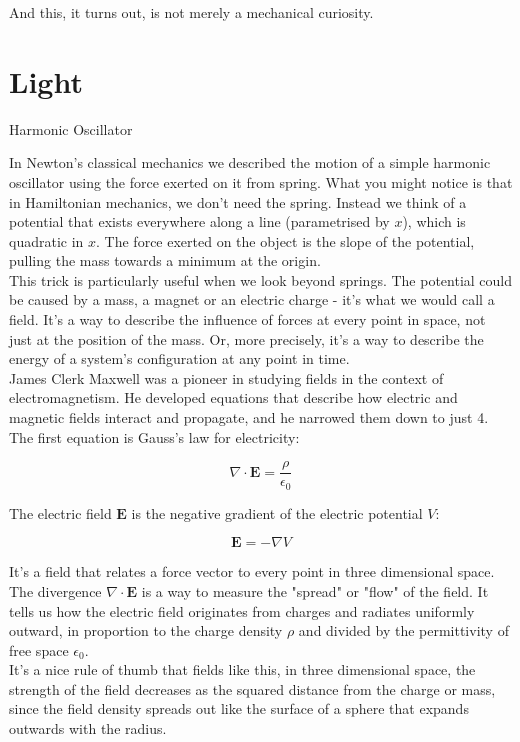 \documentclass[krantz1,ChapterTOCs]{krantz}
\begin{document}
And this, it turns out, is not merely a mechanical curiosity.\\

\part{Light}

Harmonic Oscillator

In Newton's classical mechanics we described the motion of a simple harmonic oscillator using the force exerted on it from spring. What you might notice is that in Hamiltonian mechanics, we don't need the spring. Instead we think of a potential that exists everywhere along a line (parametrised by $x$), which is quadratic in $x$. The force exerted on the object is the slope of the potential, pulling the mass towards a minimum at the origin.\\

This trick is particularly useful when we look beyond springs. The potential could be caused by a mass, a magnet or an electric charge - it's what we would call a field. It's a way to describe the influence of forces at every point in space, not just at the position of the mass. Or, more precisely, it's a way to describe the energy of a system's configuration at any point in time.\\

James Clerk Maxwell was a pioneer in studying fields in the context of electromagnetism. He developed equations that describe how electric and magnetic fields interact and propagate, and he narrowed them down to just 4.\\

The first equation is Gauss's law for electricity:

\[
\nabla \cdot \mathbf{E} = \frac{\rho}{\epsilon_0}
\]

The electric field \(\mathbf{E}\) is the negative gradient of the electric potential \(V\):

\[
\mathbf{E} = -\nabla V
\]

It's a field that relates a force vector to every point in three dimensional space. The divergence $\nabla \cdot \mathbf{E}$ is a way to measure the "spread" or "flow" of the field. It tells us how the electric field originates from charges and radiates uniformly outward, in proportion to the charge density \(\rho\) and divided by the permittivity of free space \(\epsilon_0\).\\

It's a nice rule of thumb that fields like this, in three dimensional space, the strength of the field decreases as the squared distance from the charge or mass, since the field density spreads out like the surface of a sphere that expands outwards with the radius.\\
\end{document}
